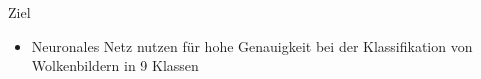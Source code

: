 \begin{frame}[t]{Ziel}
  \begin{itemize}
    \item[Ziel:] Neuronales Netz nutzen für hohe Genauigkeit bei der Klassifikation von
      Wolkenbildern in 9 Klassen
  \end{itemize}
\end{frame}
